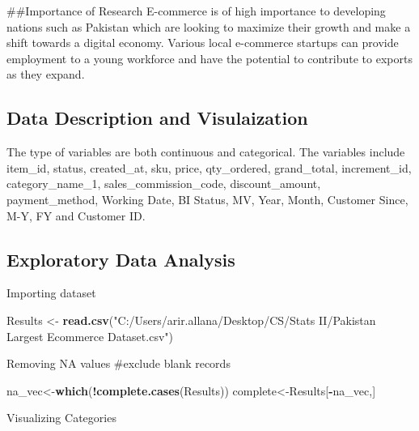 \documentclass[
]{article}
\newenvironment{Shaded}{\begin{snugshade}}{\end{snugshade}}
\newcommand{\CommentTok}[1]{\textcolor[rgb]{0.56,0.35,0.01}{\textit{#1}}}
\newcommand{\DecValTok}[1]{\textcolor[rgb]{0.00,0.00,0.81}{#1}}
\newcommand{\KeywordTok}[1]{\textcolor[rgb]{0.13,0.29,0.53}{\textbf{#1}}}
\newcommand{\NormalTok}[1]{#1}
\newcommand{\OperatorTok}[1]{\textcolor[rgb]{0.81,0.36,0.00}{\textbf{#1}}}
\newcommand{\StringTok}[1]{\textcolor[rgb]{0.31,0.60,0.02}{#1}}
\begin{document}
\#\#Importance of Research E-commerce is of high importance to
developing nations such as Pakistan which are looking to maximize their
growth and make a shift towards a digital economy. Various local
e-commerce startups can provide employment to a young workforce and have
the potential to contribute to exports as they expand.

\hypertarget{data-description-and-visulaization}{%
\subsection{Data Description and
Visulaization}\label{data-description-and-visulaization}}

The type of variables are both continuous and categorical. The variables
include item\_id, status, created\_at, sku, price, qty\_ordered,
grand\_total, increment\_id, category\_name\_1, sales\_commission\_code,
discount\_amount, payment\_method, Working Date, BI Status, MV, Year,
Month, Customer Since, M-Y, FY and Customer ID.

\hypertarget{exploratory-data-analysis}{%
\subsection{Exploratory Data Analysis}\label{exploratory-data-analysis}}

Importing dataset

\begin{Shaded}
\begin{Highlighting}[]
\NormalTok{Results <-}\StringTok{ }\KeywordTok{read.csv}\NormalTok{(}\StringTok{"C:/Users/arir.allana/Desktop/CS/Stats II/Pakistan Largest Ecommerce Dataset.csv"}\NormalTok{)}
\end{Highlighting}
\end{Shaded}

Removing NA values \#exclude blank records

\begin{Shaded}
\begin{Highlighting}[]
\NormalTok{na_vec<-}\KeywordTok{which}\NormalTok{(}\OperatorTok{!}\KeywordTok{complete.cases}\NormalTok{(Results))}
\NormalTok{complete<-Results[}\OperatorTok{-}\NormalTok{na_vec,]}
\end{Highlighting}
\end{Shaded}

Visualizing Categories

\begin{Shaded}
\end{Shaded}
\end{document}
